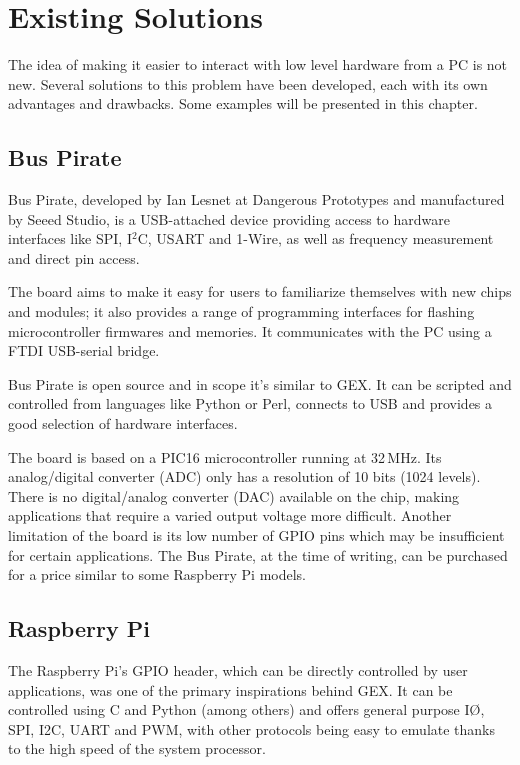 \chapter{\label{sec:prior-art}Existing Solutions}

The idea of making it easier to interact with low level hardware from a PC is not new. Several solutions to this problem have been developed, each with its own advantages and drawbacks. Some examples will be presented in this chapter.

\section{Bus Pirate}



Bus Pirate, developed by Ian Lesnet at Dangerous Prototypes and manufactured by Seeed Studio, is a USB-attached device providing access to hardware interfaces like SPI, I$^2$C, USART and 1-Wire, as well as frequency measurement and direct pin access.

The board aims to make it easy for users to familiarize themselves with new chips and modules; it also provides a range of programming interfaces for flashing microcontroller firmwares and memories. It communicates with the PC using a FTDI USB-serial bridge.

Bus Pirate is open source and in scope it's similar to GEX. It can be scripted and controlled from languages like Python or Perl, connects to USB and provides a good selection of hardware interfaces.

The board is based on a PIC16 microcontroller running at 32\,MHz. Its analog/digital converter (ADC) only has a resolution of 10 bits (1024 levels). There is no digital/analog converter (DAC) available on the chip, making applications that require a varied output voltage more difficult. Another limitation of the board is its low number of GPIO pins which may be insufficient for certain applications. The Bus Pirate, at the time of writing, can be purchased for a price similar to some Raspberry Pi models.

\section{Raspberry Pi}


The Raspberry Pi's GPIO header, which can be directly controlled by user applications, was one of the primary inspirations behind GEX. It can be controlled using C and Python (among others) and offers general purpose I\O, SPI, I2C, UART and PWM, with other protocols being easy to emulate thanks to the high speed of the system processor.

